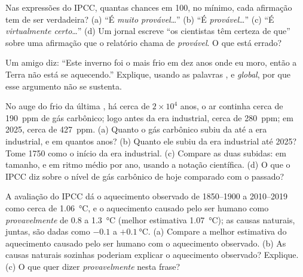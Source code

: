 \begin{exercise}[$\star\star$]\label{exo:g9:climate-past-and-present:9}
Nas expressões do IPCC, quantas chances em 100, no mínimo, cada
afirmação tem de ser verdadeira? (a) ``É \emph{muito provável}\ldots''
(b) ``É \emph{provável}\ldots'' (c) ``É \emph{virtualmente
certo}\ldots'' (d) Um jornal escreve ``os cientistas têm certeza de
que'' sobre uma afirmação que o relatório chama de \emph{provável}. O que
está errado?
\end{exercise}

\begin{exercise}[$\star\star$]\label{exo:g9:climate-past-and-present:10}
Um amigo diz: ``Este inverno foi o mais frio em dez anos onde eu moro,
então a Terra não está se aquecendo.'' Explique, usando as palavras
\emph{}, \emph{} e \emph{global}, por que esse argumento não se
sustenta.
\end{exercise}

\begin{exercise}[$\star\star\star$]\label{exo:g9:climate-past-and-present:11}
No auge do frio da última , há cerca de $2 \times 10^4$ anos, o
ar continha cerca de \qty{190}{ppm} de gás carbônico; logo antes da era
industrial, cerca de \qty{280}{ppm}; em 2025, cerca de \qty{427}{ppm}.
(a) Quanto o gás carbônico subiu da  até a era industrial, e em
quantos anos? (b) Quanto ele subiu da era industrial até 2025? Tome 1750
como o início da era industrial. (c) Compare as duas subidas: em
tamanho, e em ritmo médio por ano, usando a notação científica. (d) O que
o IPCC diz sobre o nível de gás carbônico de hoje comparado com o
passado?
\end{exercise}

\begin{exercise}[$\star\star\star$]\label{exo:g9:climate-past-and-present:12}
A avaliação do IPCC dá o aquecimento observado de 1850--1900 a
2010--2019 como cerca de \qty{1.06}{\degreeCelsius}, e o aquecimento
causado pelo ser humano como \emph{provavelmente} de 0.8 a
\qty{1.3}{\degreeCelsius} (melhor estimativa \qty{1.07}{\degreeCelsius});
as causas naturais, juntas, são dadas como
$-0.1$ a $+\qty{0.1}{\degreeCelsius}$. (a) Compare a melhor estimativa do
aquecimento causado pelo ser humano com o aquecimento observado. (b) As
causas naturais sozinhas poderiam explicar o aquecimento observado?
Explique. (c) O que quer dizer \emph{provavelmente} nesta frase?
\end{exercise}

